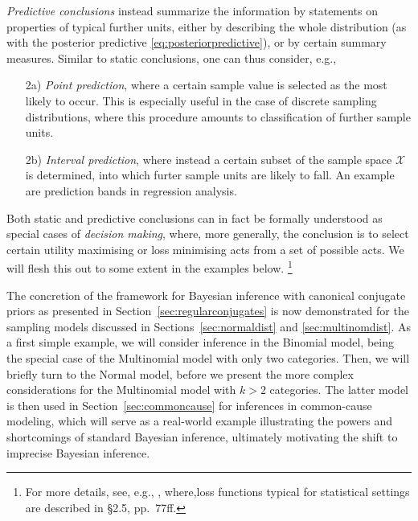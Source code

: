 \emph{Predictive conclusions} instead summarize the information by statements on properties of typical further units,
either by describing the whole distribution (as with the posterior predictive \eqref{eq:posteriorpredictive}),
or by certain summary measures.
Similar to static conclusions, one can thus consider, e.g.,
\begin{enumerate}
\item[2a)] \emph{Point prediction},
where a certain sample value is selected as the most likely to occur.
This is especially useful in the case of discrete sampling distributions,
where this procedure amounts to classification of further sample units.
\item[2b)] \emph{Interval prediction},
where instead a certain subset of the sample space $\mathcal{X}$ is determined,
into which furter sample units are likely to fall.
An example are prediction bands in regression analysis.
\end{enumerate}

Both static and predictive conclusions can in fact be formally understood as special cases of \emph{decision making},
where, more generally, the conclusion is to select certain utility maximising or loss minimising acts from a set of possible acts.
We will flesh this out to some extent in the examples below.%
\footnote{For more details, see, e.g., \textcite[\S 2]{2007:robert},
where,loss functions typical for statistical settings are described in \S 2.5, pp.~77ff.}

\medskip

The concretion of the framework for Bayesian inference with canonical conjugate priors
as presented in Section~\ref{sec:regularconjugates}
is now demonstrated for the sampling models discussed in Sections~\ref{sec:normaldist} and \ref{sec:multinomdist}.
As a first simple example, we will consider inference in the Binomial model,
being the special case of the Multinomial model with only two categories.
Then, we will briefly turn to the Normal model,
before we present the more complex considerations for the Multinomial model with $k>2$ categories.
The latter model %
is then used in Section~\ref{sec:commoncause} for inferences in common-cause modeling,
which will serve as a real-world example illustrating the powers and shortcomings of standard Bayesian inference,
ultimately motivating the shift to imprecise Bayesian inference.


